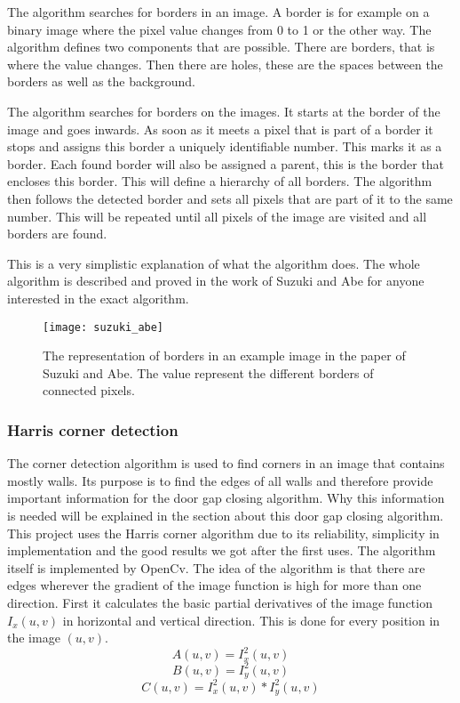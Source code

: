 The algorithm searches for borders in an image. A border is for example on a binary image where the pixel value changes from 0 to 1 or the other way. The algorithm defines two components that are possible. There are borders, that is where the value changes. Then there are holes, these are the spaces between the borders as well as the background.

The algorithm searches for borders on the images. It starts at the border of the image and goes inwards. As soon as it meets a pixel that is part of a border it stops and assigns this border a uniquely identifiable number. This marks it as a border. Each found border will also be assigned a parent, this is the border that encloses this border. This will define a hierarchy of all borders. The algorithm then follows the detected border and sets all pixels that are part of it to the same number. This will be repeated until all pixels of the image are visited and all borders are found.

This is a very simplistic explanation of what the algorithm does. The whole algorithm is described and proved in the work of Suzuki and Abe \citep{suzuki_abe_1985} for anyone interested in the exact algorithm.

\begin{figure}[h]
	\centering
	\texttt{[image: suzuki\_abe]}
	\caption{The representation of borders in an example image in the paper of Suzuki and Abe. The value represent the different borders of connected pixels.}
	\label{suzuki_abe}
\end{figure}


\subsubsection{Harris corner detection}
\label{subsubsec:HarrisCornerDetection}
The corner detection algorithm is used to find corners in an image that contains mostly walls. Its purpose is to find the edges of all walls and therefore provide important information for the door gap closing algorithm. Why this information is needed will be explained in the section about this door gap closing algorithm.
This project uses the Harris corner algorithm due to its reliability, simplicity in implementation and the good results we got after the first uses. The algorithm itself is implemented by OpenCv.
The idea of the algorithm is that there are edges wherever the gradient of the image function is high for more than one direction.
First it calculates the basic partial derivatives of the image function $I_{x}(u,v)$ in horizontal and vertical direction. This is done for every position in the image $(u,v)$.
\begin{equation}A(u,v) = I_{x}^2(u,v)\end{equation}
\begin{equation}B(u,v) = I_{y}^2(u,v)\end{equation}
\begin{equation}C(u,v) = I_{x}^2(u,v) * I_{y}^2(u,v)\end{equation}

